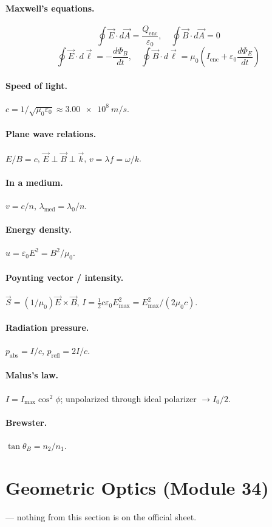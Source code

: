 \documentclass[11pt]{article}
\begin{document}
\paragraph{Maxwell's equations.}
\[
\oint\vec E\cdot d\vec A = \frac{Q_{\text{enc}}}{\varepsilon_0},\quad
\oint\vec B\cdot d\vec A = 0
\]
\[
\oint\vec E\cdot d\vec\ell = -\frac{d\Phi_B}{dt},\quad
\oint\vec B\cdot d\vec\ell = \mu_0\!\left(I_{\text{enc}} + \varepsilon_0\frac{d\Phi_E}{dt}\right)
\]
\paragraph{Speed of light.} $c = 1/\sqrt{\mu_0\varepsilon_0} \approx \SI{3.00e8}{m/s}$.
\paragraph{Plane wave relations.} $E/B = c$, $\vec E\perp\vec B\perp\vec k$, $v = \lambda f = \omega/k$.
\paragraph{In a medium.} $v = c/n$, $\lambda_{\text{med}} = \lambda_0/n$.
\paragraph{Energy density.} $u = \varepsilon_0 E^{2} = B^{2}/\mu_0$.
\paragraph{Poynting vector / intensity.}
$\vec S = (1/\mu_0)\vec E\times\vec B$,
$I = \tfrac{1}{2}c\varepsilon_0 E_{\max}^{2} = E_{\max}^{2}/(2\mu_0 c)$.
\paragraph{Radiation pressure.} $p_{\text{abs}} = I/c$, $p_{\text{refl}} = 2I/c$.
\paragraph{Malus's law.} $I = I_{\max}\cos^{2}\phi$; unpolarized through ideal polarizer $\to I_0/2$.
\paragraph{Brewster.} $\tan\theta_B = n_2/n_1$.

\section{Geometric Optics (Module 34)}
 --- nothing from this section is on the official sheet.
\end{document}
